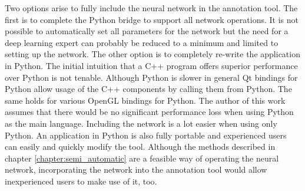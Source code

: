Two options arise to fully include the neural network in the annotation tool. The first is to complete the Python bridge to support all network operations. It is not possible to automatically set all parameters for the network but the need for a deep learning expert can probably be reduced to a minimum and limited to setting up the network. The other option is to completely re-write the application in Python. The initial intuition that a C++ program offers superior performance over Python is not tenable. Although Python is slower in general Qt bindings for Python allow usage of the C++ components by calling them from Python. The same holds for various OpenGL bindings for Python. The author of this work assumes that there would be no significant  performance loss when using Python as the main language. Including the network is a lot easier when using only Python. An application in Python is also fully portable and experienced users can easily and quickly modify the tool. Although the methods described in chapter \ref{chapter:semi_automatic} are a feasible way of operating the neural network, incorporating the network into the annotation tool would allow inexperienced users to make use of it, too.

